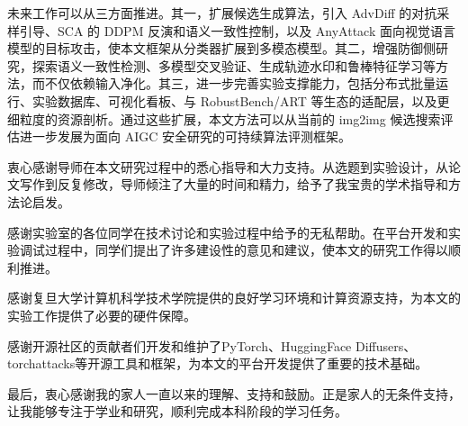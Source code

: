 \documentclass[type=bachelor,oneside]{fduthesis}
\begin{document}
未来工作可以从三方面推进。其一，扩展候选生成算法，引入 AdvDiff 的对抗采样引导、SCA 的 DDPM 反演和语义一致性控制，以及 AnyAttack 面向视觉语言模型的目标攻击，使本文框架从分类器扩展到多模态模型。其二，增强防御侧研究，探索语义一致性检测、多模型交叉验证、生成轨迹水印和鲁棒特征学习等方法，而不仅依赖输入净化。其三，进一步完善实验支撑能力，包括分布式批量运行、实验数据库、可视化看板、与 RobustBench/ART 等生态的适配层，以及更细粒度的资源剖析。通过这些扩展，本文方法可以从当前的 img2img 候选搜索评估进一步发展为面向 AIGC 安全研究的可持续算法评测框架。\backmatter

\printbibliography

\begin{acknowledgements}
衷心感谢导师在本文研究过程中的悉心指导和大力支持。从选题到实验设计，从论文写作到反复修改，导师倾注了大量的时间和精力，给予了我宝贵的学术指导和方法论启发。

感谢实验室的各位同学在技术讨论和实验过程中给予的无私帮助。在平台开发和实验调试过程中，同学们提出了许多建设性的意见和建议，使本文的研究工作得以顺利推进。

感谢复旦大学计算机科学技术学院提供的良好学习环境和计算资源支持，为本文的实验工作提供了必要的硬件保障。

感谢开源社区的贡献者们开发和维护了PyTorch、HuggingFace Diffusers、torchattacks等开源工具和框架，为本文的平台开发提供了重要的技术基础。

最后，衷心感谢我的家人一直以来的理解、支持和鼓励。正是家人的无条件支持，让我能够专注于学业和研究，顺利完成本科阶段的学习任务。
\end{acknowledgements}
\end{document}
